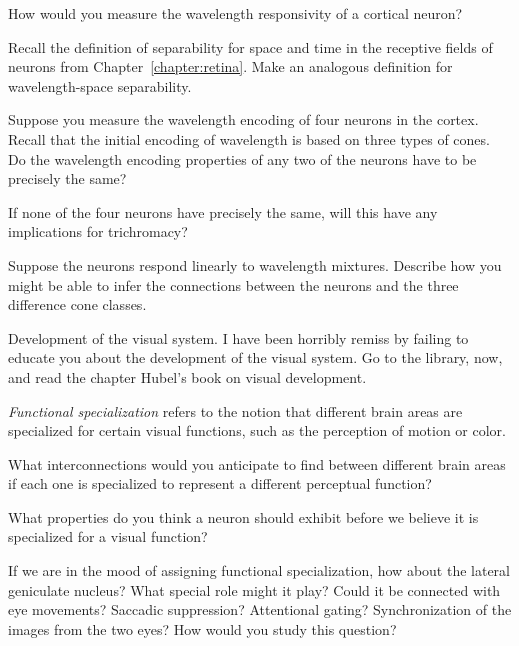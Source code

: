  \be

 \item How would you measure the wavelength responsivity
of a cortical neuron?

\item Recall the definition of separability for space and time
in the receptive fields of neurons from Chapter~\ref{chapter:retina}.
Make an analogous definition for wavelength-space separability.

 \item Suppose you measure the wavelength encoding of four
neurons in the cortex.
Recall that the  initial encoding of wavelength  is based on
three types of cones.
Do the wavelength encoding properties of any two of the neurons
have to be precisely the same?

\item If none of the four neurons
have precisely the same, will
this have any implications for trichromacy?

 \item Suppose the neurons respond linearly to wavelength mixtures.
Describe how you might be able to infer the connections
between the neurons and the three difference cone classes.

 \ee

\item Development of the visual system.
I have been horribly remiss by failing
to educate you about the development of the visual system.
Go to the library, now, and read the chapter
Hubel's book on visual development.

\item {\em Functional specialization} refers to the notion
that different brain areas are specialized for certain
visual functions, such as the perception of motion or color.

 \be

 \item What interconnections would you anticipate
to find between different brain areas if each one
is specialized to represent a different perceptual
function?

 \item What properties do you think a neuron should
exhibit before we believe it is specialized for a visual function?

 \item If we are in the mood of assigning functional specialization,
how about the lateral geniculate nucleus?
What special role might it play?
Could it be connected with eye movements?  Saccadic
suppression?  Attentional gating? Synchronization of the
images from the two eyes?  How would you study this question?

 \ee

\ee %

